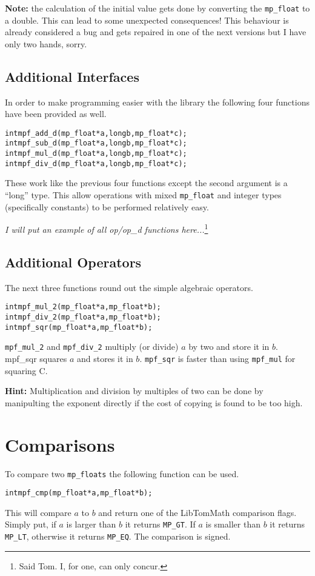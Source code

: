 \documentclass[a4paper]{book}
\theoremstyle{definition}
\theoremstyle{remark}
\begin{document}
{\textbf{Note:}} the calculation of the initial value gets done by converting the {\texttt{mp\_float}} to a double. This can lead to some unexpected consequences! This behaviour is already considered a bug and gets repaired in one of the next versions but I have only two hands, sorry.

\subsection{Additional Interfaces}
In order to make programming easier with the library the following four functions have been provided as well.

    
\begin{alltt}
int  mpf_add_d(mp_float *a, long b, mp_float *c);
int  mpf_sub_d(mp_float *a, long b, mp_float *c);
int  mpf_mul_d(mp_float *a, long b, mp_float *c);
int  mpf_div_d(mp_float *a, long b, mp_float *c);
\end{alltt}
These work like the previous four functions except the second argument is a ``long'' type.  This allow operations with mixed {\texttt{mp\_float}} and integer types (specifically constants) to be performed relatively easy.  

\textit{I will put an example of all op/op\_d functions here...}\footnote{Said Tom. I, for one, can only concur.}

\subsection{Additional Operators}
The next three functions round out the simple algebraic operators.

  
\begin{alltt}
int  mpf_mul_2(mp_float *a, mp_float *b);
int  mpf_div_2(mp_float *a, mp_float *b);
int  mpf_sqr(mp_float *a, mp_float *b);
\end{alltt}

{\texttt{mpf\_mul\_2}} and {\texttt{mpf\_div\_2}} multiply (or divide) $a$ by two and store it in $b$.  mpf\_sqr squares $a$ and stores it in $b$.  {\texttt{mpf\_sqr}} is
faster than using {\texttt{mpf\_mul}} for squaring C.

{\textbf{Hint:}} Multiplication and division by multiples of two can be done by manipulting the exponent directly if the cost of copying is found to be too high.

\section{Comparisons}
To compare two {\texttt{mp\_floats}} the following function can be used.
\begin{alltt}
int  mpf_cmp(mp_float *a,   mp_float *b);
\end{alltt}
This will compare $a$ to $b$ and return one of the LibTomMath comparison flags.  Simply put, if $a$ is larger than $b$ it returns {\texttt{MP\_GT}}. If $a$ is smaller than $b$ it returns
{\texttt{MP\_LT}}, otherwise it returns {\texttt{MP\_EQ}}. The comparison is signed.
\end{document}
